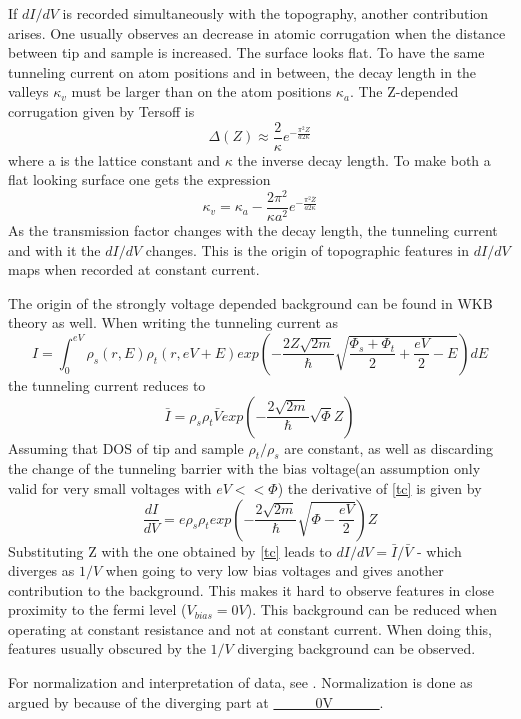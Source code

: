 If $dI/dV$ is recorded simultaneously with the topography, another contribution arises. One usually observes an decrease in atomic corrugation when the distance between tip and sample is increased. The surface looks flat. To have the same tunneling current on atom positions and in between, the decay length in the valleys $\kappa_v$ must be larger than on the atom positions $\kappa_a$. The Z-depended corrugation given by Tersoff is $$\Delta(Z)\approx \frac{2}{\kappa}e^{-\frac{\pi^2Z}{a2\kappa}}$$ where a is the lattice constant and $\kappa$ the inverse decay length. To make both a flat looking surface one gets the expression
$$\kappa_v=\kappa_a-\frac{2\pi^2}{\kappa a^2}e^{-\frac{\pi^2\bar Z}{a2\kappa}}$$ 
As the transmission factor changes with the decay length, the tunneling current and with it the $dI/dV$ changes. This is the origin of topographic features in $dI/dV$ maps when recorded at constant current.

The origin of the strongly voltage depended background can be found in WKB theory as well.
When writing the tunneling current as 
$$ I=\int_0^{eV}\rho_s(r,E)\rho_t(r,eV+E)exp\left(-\frac{2Z\sqrt{2m}}{\hbar}\sqrt{\frac{\Phi_s+\Phi_t}{2}+\frac{eV}{2}-E}\right)dE $$
the tunneling current reduces to 
\begin{equation}
\bar I=\rho_s\rho_t \bar V exp\left(-\frac{2\sqrt{2m}}{\hbar}\sqrt{\Phi}Z\right)
\label{tc}
\end{equation}
Assuming that DOS of tip and sample $\rho_t/\rho_s$ are constant, as well as discarding the change of the tunneling barrier with the bias voltage(an assumption only valid for very small voltages with $eV<<\Phi$) the derivative of \eqref{tc} is given by
$$\frac{dI}{dV}=e\rho_s\rho_texp\left(-\frac{2\sqrt{2m}}{\hbar}\sqrt{\Phi-\frac{eV}{2}}\right)Z$$
Substituting Z with the one obtained by \eqref{tc} leads to $dI/dV= \bar I / \bar V$ - which diverges as  $1/V$ when going to very low bias voltages and gives another contribution to the background. This makes it hard to observe features in close proximity to the fermi level ($V_{bias}=0V$). This background can be reduced when operating at constant resistance and not at constant current. When doing this, features usually obscured by the $1/V$ diverging background can be observed.

For normalization and interpretation of data, see \cite{bonnell_scanning_1993}.
Normalization is done as argued by\cite{feenstra_tunneling_1987} because of the diverging part at \underline{\ \ \ \ \ \ 0V \ \ \ \ \ \ }.

